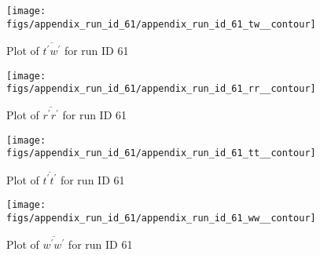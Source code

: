 \begin{figure}[H]
\centering
\texttt{[image: figs/appendix\_run\_id\_61/appendix\_run\_id\_61\_tw\_\_contour]}
\caption{Plot of $\overline{t^\prime w^\prime}$ for run ID 61}
\label{fig:appendix_run_id_61_tw__contour}
\end{figure}


\begin{figure}[H]
\centering
\texttt{[image: figs/appendix\_run\_id\_61/appendix\_run\_id\_61\_rr\_\_contour]}
\caption{Plot of $\overline{r^\prime r^\prime}$ for run ID 61}
\label{fig:appendix_run_id_61_rr__contour}
\end{figure}


\begin{figure}[H]
\centering
\texttt{[image: figs/appendix\_run\_id\_61/appendix\_run\_id\_61\_tt\_\_contour]}
\caption{Plot of $\overline{t^\prime t^\prime}$ for run ID 61}
\label{fig:appendix_run_id_61_tt__contour}
\end{figure}


\begin{figure}[H]
\centering
\texttt{[image: figs/appendix\_run\_id\_61/appendix\_run\_id\_61\_ww\_\_contour]}
\caption{Plot of $\overline{w^\prime w^\prime}$ for run ID 61}
\label{fig:appendix_run_id_61_ww__contour}
\end{figure}


